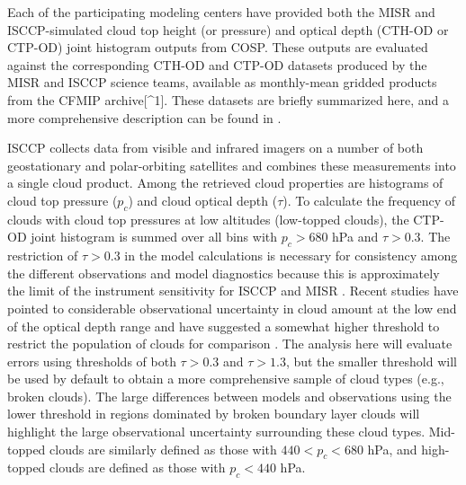 Each of the participating modeling centers have provided both the MISR
and ISCCP-simulated cloud top height (or pressure) and optical depth
(CTH-OD or CTP-OD) joint histogram outputs from COSP. These outputs are
evaluated against the corresponding CTH-OD and CTP-OD datasets produced
by the MISR and ISCCP science teams, available as monthly-mean gridded
products from the CFMIP archive{[}\^{}1{]}. These datasets are briefly
summarized here, and a more comprehensive description can be found in
\citet{marchand_et_al_2010}.

ISCCP collects data from visible and infrared imagers on a number of
both geostationary and polar-orbiting satellites and combines these
measurements into a single cloud product. Among the retrieved cloud
properties are histograms of cloud top pressure (\(p_c\)) and cloud
optical depth (\(\tau\)). To calculate the frequency of clouds with
cloud top pressures at low altitudes (low-topped clouds), the CTP-OD
joint histogram is summed over all bins with \(p_c > 680\) hPa and
\(\tau > 0.3\). The restriction of \(\tau > 0.3\) in the model
calculations is necessary for consistency among the different
observations and model diagnostics because this is approximately the
limit of the instrument sensitivity for ISCCP and MISR
\citep{marchand_et_al_2010}. Recent studies have pointed to considerable
observational uncertainty in cloud amount at the low end of the optical
depth range and have suggested a somewhat higher threshold to restrict
the population of clouds for comparison
\citep[e.g.,][]{pincus_et_al_2012, zhao_and_digirolamo_2006}. The
analysis here will evaluate errors using thresholds of both
\(\tau > 0.3\) and \(\tau > 1.3\), but the smaller threshold will be
used by default to obtain a more comprehensive sample of cloud types
(e.g., broken clouds). The large differences between models and
observations using the lower threshold in regions dominated by broken
boundary layer clouds will highlight the large observational uncertainty
surrounding these cloud types. Mid-topped clouds are similarly defined
as those with \(440 < p_c < 680\) hPa, and high-topped clouds are
defined as those with \(p_c < 440\) hPa.

